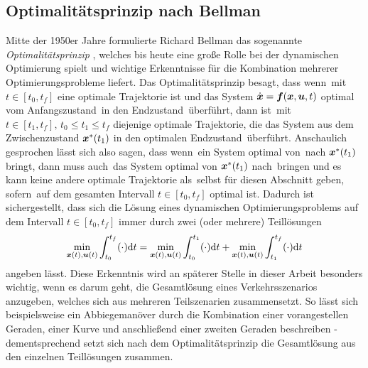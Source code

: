 \subsection{Optimalitätsprinzip nach Bellman}\label{subsec:Optimalitätsprinzip}
Mitte der 1950er Jahre formulierte Richard Bellman das sogenannte \textit{Optimalitätsprinzip} \cite{Bellman.1984}, welches bis heute eine große Rolle bei der dynamischen Optimierung spielt und wichtige Erkenntnisse für die Kombination mehrerer Optimierungsprobleme liefert. Das Optimalitätsprinzip besagt, dass wenn \uoptoft\,mit $t\in[t_0, t_f]$ eine optimale Trajektorie ist und das System $\dot{\boldsymbol{x}} = \boldsymbol{f}(\boldsymbol{x},\boldsymbol{u},t)$ optimal vom Anfangszustand \xoftzero\,in den Endzustand \xoptoftf\,überführt, dann ist \uoptoft\,mit $t\in[t_1, t_f],\, t_0\leq t_1\leq t_f$ diejenige optimale Trajektorie, die das System aus dem Zwischenzustand ${\boldsymbol{x}}^*(t_1)$ in den optimalen Endzustand \xoptoftf\,überführt. Anschaulich gesprochen lässt sich also sagen, dass wenn \uoptoft\,ein System optimal von \xoftzero\,nach ${\boldsymbol{x}}^*(t_1)$ bringt, dann muss auch \uoptoft\,das System optimal von ${\boldsymbol{x}}^*(t_1)$ nach \xoptoftf\,bringen und es kann keine andere optimale Trajektorie als \uoptoft\,selbst für diesen Abschnitt geben, sofern \uoptoft\,auf dem gesamten Intervall $t\in[t_0, t_f]$ optimal ist. Dadurch ist sichergestellt, dass sich die Lösung eines dynamischen Optimierungsproblems auf dem Intervall $t\in[t_0, t_f]$ immer durch zwei (oder mehrere) Teillösungen 
\begin{equation}
	\min_{\boldsymbol{x}(t),\boldsymbol{u}(t)} \int_{t_0}^{t_f}(\cdot)\textrm{d}{t} = \min_{\boldsymbol{x}(t),\boldsymbol{u}(t)} \int_{t_0}^{t_1}(\cdot)\textrm{d}{t} + \min_{\boldsymbol{x}(t),\boldsymbol{u}(t)} \int_{t_1}^{t_f}(\cdot)\textrm{d}{t}
\end{equation}
angeben lässt. Diese Erkenntnis wird an späterer Stelle in dieser Arbeit besonders wichtig, wenn es darum geht, die Gesamtlösung eines Verkehrsszenarios anzugeben, welches sich aus mehreren Teilszenarien zusammensetzt. So lässt sich beispielsweise ein Abbiegemanöver durch die Kombination einer vorangestellen Geraden, einer Kurve und anschließend einer zweiten Geraden beschreiben - dementsprechend setzt sich nach dem Optimalitätsprinzip die Gesamtlösung aus den einzelnen Teillösungen zusammen.

